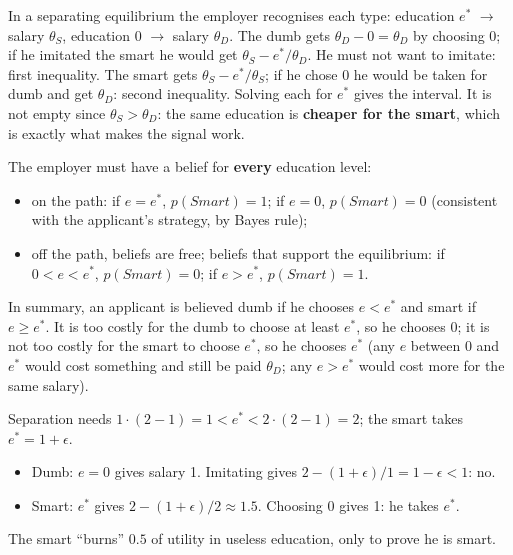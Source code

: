 \documentclass[11pt,a4paper,openany]{book}
\begin{document}
\begin{rembox}[title=Where the inequalities come from]
In a separating equilibrium the employer recognises each type: education $e^*$ $\to$ salary
$\theta_S$, education 0 $\to$ salary $\theta_D$. The dumb gets $\theta_D - 0 = \theta_D$ by
choosing 0; if he imitated the smart he would get $\theta_S - e^*/\theta_D$. He must not want
to imitate: first inequality. The smart gets $\theta_S - e^*/\theta_S$; if he chose 0 he would
be taken for dumb and get $\theta_D$: second inequality. Solving each for $e^*$ gives the
interval. It is not empty since $\theta_S > \theta_D$: the same education is
\textbf{cheaper for the smart}, which is exactly what makes the signal work.
\end{rembox}

\begin{propbox}[title=Beliefs supporting the separating equilibrium]
The employer must have a belief for \textbf{every} education level:
\begin{itemize}
  \item on the path: if $e = e^*$, $p(Smart) = 1$; if $e = 0$, $p(Smart) = 0$ (consistent
        with the applicant's strategy, by Bayes rule);
  \item off the path, beliefs are free; beliefs that support the equilibrium: if
        $0 < e < e^*$, $p(Smart) = 0$; if $e > e^*$, $p(Smart) = 1$.
\end{itemize}
In summary, an applicant is believed dumb if he chooses $e < e^*$ and smart if $e \ge e^*$.
It is too costly for the dumb to choose at least $e^*$, so he chooses 0; it is not too costly
for the smart to choose $e^*$, so he chooses $e^*$ (any $e$ between 0 and $e^*$ would cost
something and still be paid $\theta_D$; any $e > e^*$ would cost more for the same salary).
\end{propbox}

\begin{exbox}[title={Numbers (not on the slides): $\theta_S = 2$, $\theta_D = 1$}]
Separation needs $1 \cdot (2-1) = 1 < e^* < 2 \cdot (2-1) = 2$; the smart takes
$e^* = 1 + \epsilon$.
\begin{itemize}
  \item Dumb: $e = 0$ gives salary 1. Imitating gives $2 - (1+\epsilon)/1 = 1 - \epsilon < 1$:
        no.
  \item Smart: $e^*$ gives $2 - (1+\epsilon)/2 \approx 1.5$. Choosing 0 gives 1: he takes
        $e^*$.
\end{itemize}
The smart ``burns'' $0.5$ of utility in useless education, only to prove he is smart.
\end{exbox}
\end{document}
